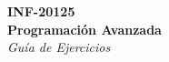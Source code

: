 \thispagestyle{empty}

\begin{center}
    \Huge
    \textbf{INF-20125 \\ Programación Avanzada} \\
    \emph{Guía de Ejercicios}
\end{center}

